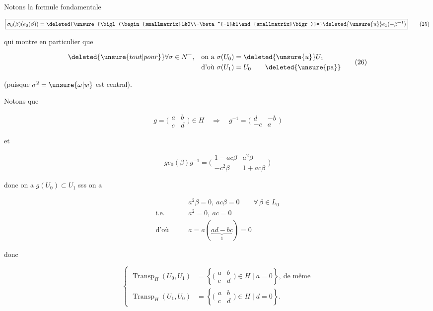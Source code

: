 
Notons la formule fondamentale

\[
\boxed{\sigma_0(\beta)(e_0(\beta))=\deleted{\unsure{\bigl(\begin{smallmatrix}1&0\\-\beta^{-1}&1\end{smallmatrix}\bigr)}=}\deleted{\unsure{u}}e_1(-\beta^{-1})}\tag*{(25)}
\]


qui  montre en particulier que

\[
\begin{aligned}
 \deleted{\unsure{tout|pour}}\forall\sigma\in N^-,\quad &\text{on a }\sigma(U_0)=\deleted{\unsure{u}}U_1\\
 &\text{d'où }\sigma(U_1)=U_0\qquad\deleted{\text{\unsure{pa}}}
\end{aligned}\tag*{(26)}
\]

(puisque $\sigma^2=\unsure{\omega|w}$ est central).

Notons que

\[
g=\bigl(\begin{smallmatrix}a&b\\c&d\end{smallmatrix}\bigr)\in H\quad\Longrightarrow\quad g^{-1}=\bigl(\begin{smallmatrix}d&-b\\-c&a\end{smallmatrix}\bigr)\tag*{(27)}
\]

et

\[
g e_0(\beta)g^{-1}=\bigl(\begin{smallmatrix}1-ac\beta&a^2\beta\\-c^2\beta&1+ac\beta\end{smallmatrix}\bigr)\tag*{(28)}
\]

donc on a $g(U_0)\subset U_1$ sss on a

\[
\begin{aligned}
 &a^2\beta=0,\ ac\beta=0\qquad\forall\,\beta\in L_0\\
 \text{i.e.}\qquad &a^2=0,\ ac=0\\
 \text{d'où}\qquad &a=a(\underbrace{ad-bc}_{1})=0
\end{aligned}
\]

donc

\[
\left\{\begin{aligned}
 \operatorname{Transp}_H(U_0,U_1)&=\left\{\bigl(\begin{smallmatrix}a&b\\c&d\end{smallmatrix}\bigr)\in H\mid a=0\right\},\ \text{de même}\\
 \operatorname{Transp}_H(U_1,U_0)&=\left\{\bigl(\begin{smallmatrix}a&b\\c&d\end{smallmatrix}\bigr)\in H\mid d=0\right\}.
\end{aligned}\right.\tag*{(29)}
\]

